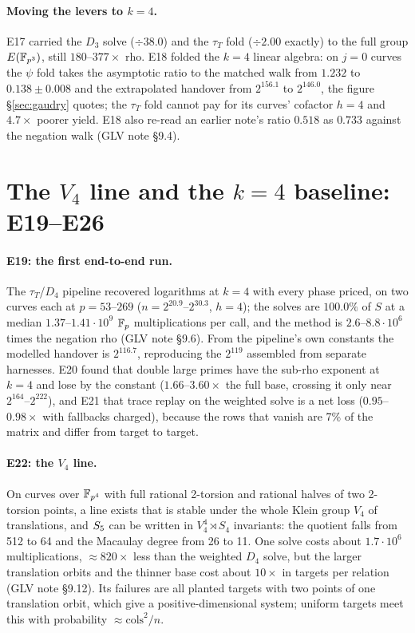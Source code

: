 \paragraph{Moving the levers to $k=4$.} E17 carried the $D_3$ solve
($\div38.0$) and the $\tau_T$ fold ($\div2.00$ exactly) to the full group
$E(\mathbb{F}_{p^3})$, still $180$--$377\times$ rho. E18 folded the $k=4$ linear
algebra: on $j=0$ curves the $\psi$ fold takes the asymptotic ratio to the
matched walk from $1.232$ to $0.138\pm0.008$ and the extrapolated handover
from $2^{156.1}$ to $2^{146.0}$, the figure \S\ref{sec:gaudry} quotes; the
$\tau_T$ fold cannot pay for its curves' cofactor $h=4$ and $4.7\times$
poorer yield. E18 also re-read an earlier note's ratio $0.518$ as $0.733$
against the negation walk (GLV note \S9.4).

\section{The $V_4$ line and the $k=4$ baseline: E19--E26}\label{sec:glv-v4}

\paragraph{E19: the first end-to-end run.} The $\tau_T$/$D_4$ pipeline
recovered logarithms at $k=4$ with every phase priced, on two curves each at
$p=53$--$269$ ($n=2^{20.9}$--$2^{30.3}$, $h=4$); the solves are $100.0\%$ of
$S$ at a median $1.37$--$1.41\cdot10^9$ $\mathbb{F}_p$ multiplications per call, and
the method is $2.6$--$8.8\cdot10^6$ times the negation rho (GLV note \S9.6).
From the pipeline's own constants the modelled handover is $2^{116.7}$,
reproducing the $2^{119}$ assembled from separate harnesses. E20 found that
double large primes have the sub-rho exponent at $k=4$ and lose by the
constant ($1.66$--$3.60\times$ the full base, crossing it only near
$2^{164}$--$2^{222}$), and E21 that trace replay on the weighted solve is a net
loss ($0.95$--$0.98\times$ with fallbacks charged), because the rows that
vanish are 7\% of the matrix and differ from target to target.

\paragraph{E22: the $V_4$ line.} On curves over $\mathbb{F}_{p^4}$ with full
rational 2-torsion and rational halves of two 2-torsion points, a line
exists that is stable under the whole Klein group $V_4$ of translations, and
$S_{5}$ can be written in $V_4^4\rtimes S_4$ invariants: the quotient falls
from 512 to 64 and the Macaulay degree from 26 to 11. One solve costs about
$1.7\cdot10^6$ multiplications, $\approx820\times$ less than the weighted $D_4$
solve, but the larger translation orbits and the thinner base cost about
$10\times$ in targets per relation (GLV note \S9.12). Its failures are all
planted targets with two points of one translation orbit, which give a
positive-dimensional system; uniform targets meet this with probability
$\approx\mathrm{cols}^2/n$.

